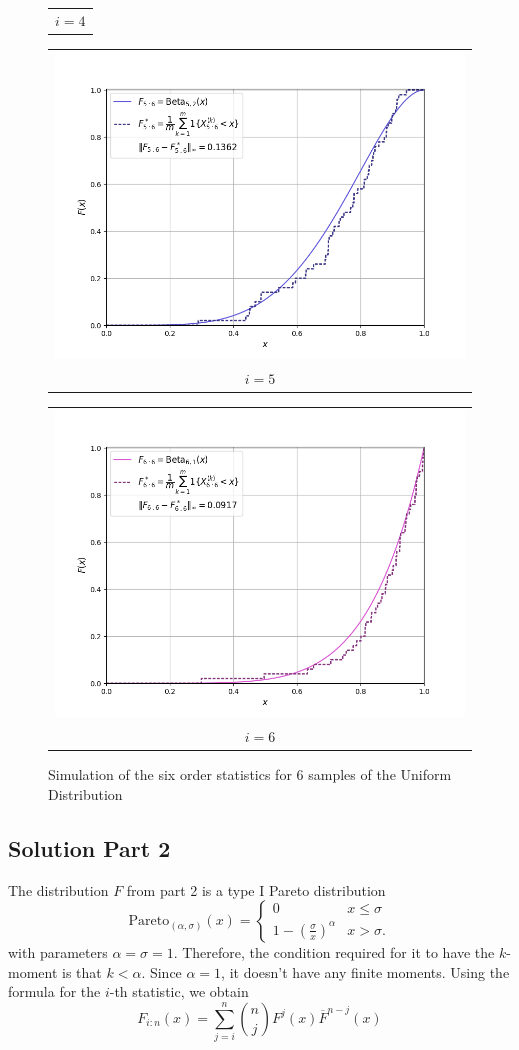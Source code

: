 \begin{figure}[H]
\begin{tabular}{@{}c@{}}
        $i = 4$
    \end{tabular}
    \begin{tabular}{@{}c@{}}
        \includegraphics[trim={1.1cm 0.5cm 1.5cm 0cm}, clip,width=.46\linewidth]{../simulation/unif_order_5:6.png} \\
        $i = 5$
      \end{tabular}
    \begin{tabular}{@{}c@{}}
        \includegraphics[trim={1.1cm 0.5cm 1.5cm 0cm}, clip,width=.46\linewidth]{../simulation/unif_order_6:6.png} \\
        $i = 6$
    \end{tabular}
    \caption{Simulation of the six order statistics for 6 samples of the Uniform Distribution}
\end{figure}

\newpage

\subsection*{Solution Part 2}

The distribution $F$ from part 2 is a type I Pareto distribution
\[ \text{Pareto}_{(\alpha, \sigma)}(x) = \begin{cases}
    0 & x\leq \sigma \\
    1- {\left( \frac{\sigma}{x} \right)}^{\alpha} & x > \sigma.
\end{cases} \]
with parameters $\alpha = \sigma = 1$. Therefore, the condition required for it to have the $k$-moment is that $k < \alpha$. Since $\alpha = 1$, it doesn't have any finite moments. Using the formula for the $i$-th statistic, we obtain
\[ F_{i:n}(x) = \sum_{j = i}^n \binom{n}{j} F^{j}(x)\overline{F}^{n-j}(x)\]

